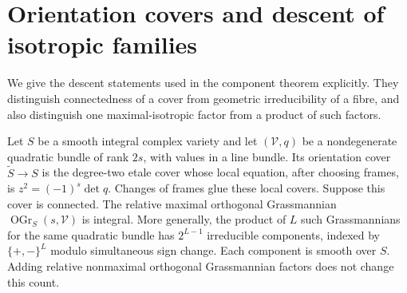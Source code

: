 \section{Orientation covers and descent of isotropic families}
\label{sec:orientation-descent}
We give the descent statements used in the component theorem explicitly.
They distinguish connectedness of a cover from geometric irreducibility
of a fibre, and also distinguish one maximal-isotropic factor from a
product of such factors.

\begin{proposition}\label{prop:orientation-descent}
Let $S$ be a smooth integral complex variety and let $(\mathcal V,q)$
be a nondegenerate quadratic bundle of rank $2s$, with values in a line
bundle. Its orientation cover $\widetilde S\to S$ is the degree-two
etale cover whose local equation, after choosing frames, is
$z^2=(-1)^s\det q$. Changes of frames glue these local covers.
Suppose this cover is connected. The relative maximal orthogonal
Grassmannian $\operatorname{OGr}_S(s,\mathcal V)$ is integral.
More generally, the product of $L$ such Grassmannians for the same
quadratic bundle has $2^{L-1}$ irreducible components, indexed by
$\{+,-\}^L$ modulo simultaneous sign change.
Each component is smooth over $S$. Adding relative nonmaximal
orthogonal Grassmannian factors does not change this count.
\end{proposition}
